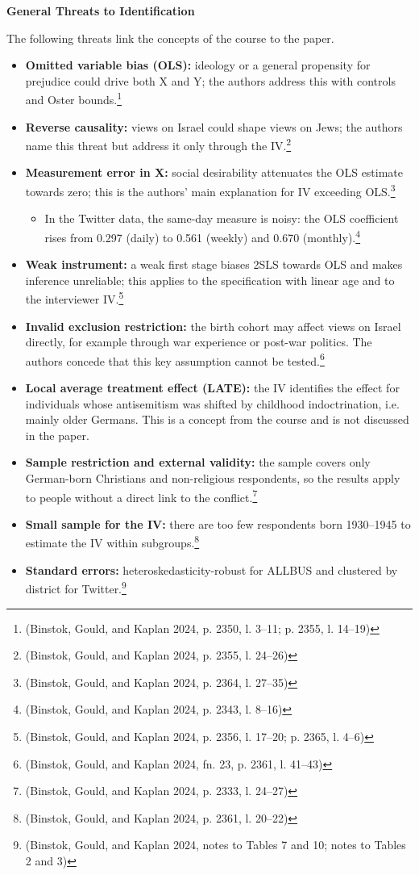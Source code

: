 \par\textbf{General Threats to Identification}\par

The following threats link the concepts of the course to the paper.

\begin{itemize}
\item
  \textbf{Omitted variable bias (OLS):} ideology or a general propensity for prejudice could drive both X and Y; the authors address this with controls and Oster bounds.\footnote{(Binstok, Gould, and Kaplan 2024, p. 2350, l. 3--11; p. 2355, l. 14--19)}
\item
  \textbf{Reverse causality:} views on Israel could shape views on Jews; the authors name this threat but address it only through the IV.\footnote{(Binstok, Gould, and Kaplan 2024, p. 2355, l. 24--26)}
\item
  \textbf{Measurement error in X:} social desirability attenuates the OLS estimate towards zero; this is the authors' main explanation for IV exceeding OLS.\footnote{(Binstok, Gould, and Kaplan 2024, p. 2364, l. 27--35)}

  \begin{itemize}
  \item
    In the Twitter data, the same-day measure is noisy: the OLS coefficient rises from 0.297 (daily) to 0.561 (weekly) and 0.670 (monthly).\footnote{(Binstok, Gould, and Kaplan 2024, p. 2343, l. 8--16)}
  \end{itemize}
\item
  \textbf{Weak instrument:} a weak first stage biases 2SLS towards OLS and makes inference unreliable; this applies to the specification with linear age and to the interviewer IV.\footnote{(Binstok, Gould, and Kaplan 2024, p. 2356, l. 17--20; p. 2365, l. 4--6)}
\item
  \textbf{Invalid exclusion restriction:} the birth cohort may affect views on Israel directly, for example through war experience or post-war politics. The authors concede that this key assumption cannot be tested.\footnote{(Binstok, Gould, and Kaplan 2024, fn. 23, p. 2361, l. 41--43)}
\item
  \textbf{Local average treatment effect (LATE):} the IV identifies the effect for individuals whose antisemitism was shifted by childhood indoctrination, i.e. mainly older Germans. This is a concept from the course and is not discussed in the paper.
\item
  \textbf{Sample restriction and external validity:} the sample covers only German-born Christians and non-religious respondents, so the results apply to people without a direct link to the conflict.\footnote{(Binstok, Gould, and Kaplan 2024, p. 2333, l. 24--27)}
\item
  \textbf{Small sample for the IV:} there are too few respondents born 1930--1945 to estimate the IV within subgroups.\footnote{(Binstok, Gould, and Kaplan 2024, p. 2361, l. 20--22)}
\item
  \textbf{Standard errors:} heteroskedasticity-robust for ALLBUS and clustered by district for Twitter.\footnote{(Binstok, Gould, and Kaplan 2024, notes to Tables 7 and 10; notes to Tables 2 and 3)}
\end{itemize}

